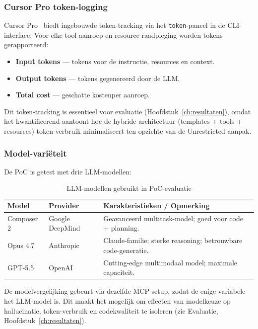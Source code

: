 \subsubsection{Cursor Pro token-logging}

Cursor Pro~\autocite{CursorProUsage2026} biedt ingebouwde token-tracking via het \texttt{token}-paneel in de CLI-interface. Voor elke tool-aanroep en resource-raadpleging worden tokens gerapporteerd:

\begin{itemize}
  \item \textbf{Input tokens} — tokens voor de instructie, resources en context.
  \item \textbf{Output tokens} — tokens gegenereerd door de LLM.
  \item \textbf{Total cost} — geschatte kostenper aanroep.
\end{itemize}

Dit token-tracking is essentieel voor evaluatie (Hoofdstuk~\ref{ch:resultaten}), omdat het kwantificerend aantoont hoe de hybride architectuur (templates + tools + resources) token-verbruik minimaliseert ten opzichte van de Unrestricted aanpak.

\subsubsection{Model-variëteit}

De PoC is getest met drie LLM-modellen:

\begin{table}[htbp]
  \centering
  \caption{LLM-modellen gebruikt in PoC-evaluatie}
  \label{tab:models}
  \small
  \begin{tabularx}{\textwidth}{|l|l|X|}
    \hline
    \textbf{Model} & \textbf{Provider} & \textbf{Karakteristieken / Opmerking} \\
    \hline
    Composer 2 & Google DeepMind & Geavanceerd multitask-model; goed voor code + planning. \\
    \hline
    Opus 4.7 & Anthropic & Claude-familie; sterke reasoning; betrouwbare code-generatie. \\
    \hline
    GPT-5.5 & OpenAI & Cutting-edge multimodaal model; maximale capaciteit. \\
    \hline
  \end{tabularx}
\end{table}

De modelvergelijking gebeurt via dezelfde MCP-setup, zodat de enige variabele het LLM-model is. Dit maakt het mogelijk om effecten van modelkeuze op hallucinatie, token-verbruik en codekwaliteit te isoleren (zie Evaluatie, Hoofdstuk~\ref{ch:resultaten}).

